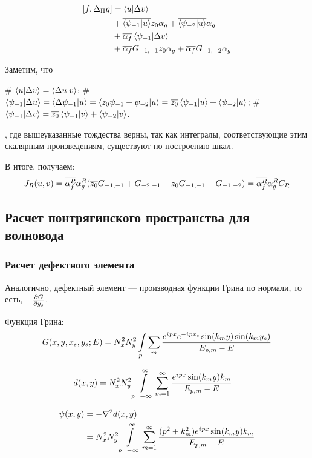 \begin{align*}
\iip{f}{\Delta_\Pi  g}
&= \ip{u}{\Delta v} \\
&+ \cconj{\ip{\psi_{-1}}{u}} z_0 \alpha_g + \cconj{\ip{\psi_{-2}}{u}} \alpha_g \\
&+ \cconj{\alpha_f} \ip{\psi_{-1}}{\Delta v} \\
&+ \cconj{\alpha_f} G_{-1, -1} z_0 \alpha_g + \cconj{\alpha_f} G_{-1, -2} \alpha_g 
\end{align*}

Заметим, что
\begin{elist}
# $\ip{u}{\Delta v} = \ip{\Delta u}{v}$;
# $\ip{\psi_{-1}}{\Delta u} = \ip{\Delta \psi_{-1}}{u} = \ip{z_0 \psi_{-1} + \psi_{-2}}{u} = \cconj{z_0} \ip{\psi_{-1}}{u} + \ip{\psi_{-2}}{u}$;
# $\ip{\psi_{-1}}{\Delta v} = \cconj{z_0} \ip{\psi_{-1}}{v} + \ip{\psi_{-2}}{v}$.
\end{elist}
, где вышеуказанные тождества верны, так как интегралы, соответствующие этим скалярным произведениям, существуют по построению шкал.

В итоге, получаем:
\begin{align*}
J_R(u, v) = \overline{\alpha^R_f} \alpha^R_g (\overline{z_0} G_{-1, -1} + G_{-2, -1} - z_0 G_{-1, -1} - G_{-1, -2}) = \overline{\alpha^R_f} \alpha^R_g C_R
\end{align*}

\subsection{Расчет понтрягинского пространства для волновода}
\subsubsection{Расчет дефектного элемента}
Аналогично, дефектный элемент — производная функции Грина по нормали, то есть, $-\pdv{G}{y_s}$.

Функция Грина:
\[
G(x, y, x_s, y_s; E) = N_x^2 N_y^2 \int\limits_p \sum\limits_m \frac{e^{{i\mkern1mu} p x} e^{-{i\mkern1mu} p x_s} \sin(k_m y) \sin(k_m y_s)}{E_{p, m} - E}
\]

\begin{align*}
d(x, y) 
&= N_x^2 N_y^2 \int\limits_{p = -\infty}^\infty \sum\limits_{m = 1}^\infty \frac{e^{{i\mkern1mu} p x} \sin(k_m y) k_m }{E_{p, m} - E}
\end{align*}

\begin{align*}
\psi(x, y) 
&= -\laplacian d(x, y) \\
&= N_x^2 N_y^2 \int\limits_{p = -\infty}^\infty \sum\limits_{m = 1}^\infty \frac{(p^2 + k_m^2) e^{\iu p x} \sin(k_m y) k_m }{E_{p, m} - E}
\end{align*}

